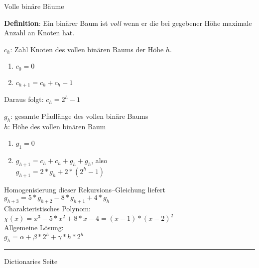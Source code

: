 
\begin{slide}{}
\normalsize

\begin{center}
Volle bin\"are B\"aume
\end{center}
\vspace*{0.5cm}

\footnotesize
\textbf{Definition}: Ein bin\"arer Baum ist \emph{voll} wenn er die bei gegebener H\"ohe
maximale Anzahl an Knoten hat.

$c_h$: Zahl Knoten des vollen bin\"aren Baums der H\"ohe $h$.
\begin{enumerate}
\item $c_0 = 0$
\item $c_{h+1} = c_h + c_h + 1$
\end{enumerate}
Daraus folgt: $c_h = 2^{h} - 1$

$g_h$: gesamte Pfadl\"ange des vollen bin\"are Baums \\[0.3cm]
$h$: H\"ohe des vollen bin\"aren Baum
\begin{enumerate}
\item $g_1 = 0$
\item $g_{h+1} = c_h + c_h + g_h + g_h$, also \\[0.3cm]
      \hspace*{1.3cm} $g_{h+1} = 2 * g_h + 2 * (2^h - 1)$
\end{enumerate}
Homogenisierung dieser Rekursions--Gleichung liefert \\[0.3cm]
\hspace*{1.3cm} $g_{h+3} = 5 * g_{h+2} - 8 * g_{h+1} + 4 * g_h$ \\[0.3cm]
Charakteristisches Polynom: \\[0.3cm]
\hspace*{1.3cm} $\chi(x) = x^3 - 5 * x^2 + 8 * x - 4 = (x - 1) * (x - 2)^2$ \\[0.3cm]
Allgemeine L\"osung: \\[0.3cm]
\hspace*{1.3cm} $g_h = \alpha + \beta * 2^h + \gamma * h * 2^h$ \\[0.3cm]


\vspace*{\fill}
\tiny \addtocounter{mypage}{1}
\rule{17cm}{1mm}
Dictionaries  \hspace*{\fill} Seite 
\end{slide}

